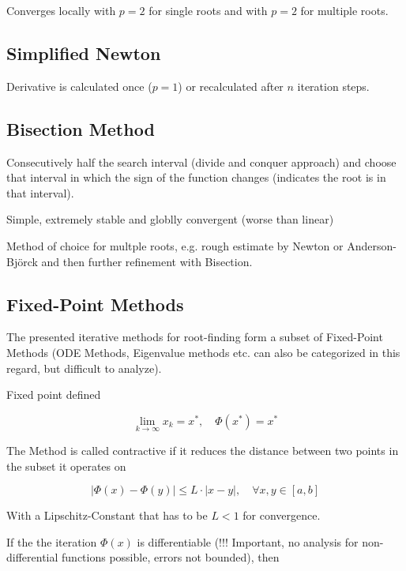 \documentclass[
    a4paper,
    11pt
]{article}
\begin{document}
Converges locally with $p=2$ for single roots and with $p=2$ for multiple roots.

\subsection{Simplified Newton}

Derivative is calculated once ($p=1$) or recalculated after $n$ iteration steps.

\subsection{Bisection Method}

Consecutively half the search interval (divide and conquer approach) and choose
that interval in which the sign of the function changes (indicates the root is
in that interval).

Simple, extremely stable and globlly convergent (worse than linear)

Method of choice for multple roots, e.g. rough estimate by Newton or
Anderson-Björck and then further refinement with Bisection.

\subsection{Fixed-Point Methods}

The presented iterative methods for root-finding form a subset of Fixed-Point
Methods (ODE Methods, Eigenvalue methods etc. can also be categorized in this
regard, but difficult to analyze).

Fixed point defined

\begin{equation}
    \lim_{k \to \infty} x_k = x^*, \quad \Phi(x^*) = x^*
\end{equation}

The Method is called contractive if it reduces the distance between two points
in the subset it operates on

\begin{equation}
    |\Phi(x) - \Phi(y) | \leq L \cdot | x - y |, \quad \forall x, y \in [a, b]
\end{equation}

With a Lipschitz-Constant that has to be $L<1$ for convergence.

If the the iteration $\Phi(x)$ is differentiable (!!! Important, no analysis for
non-differential functions possible, errors not bounded), then
\end{document}
